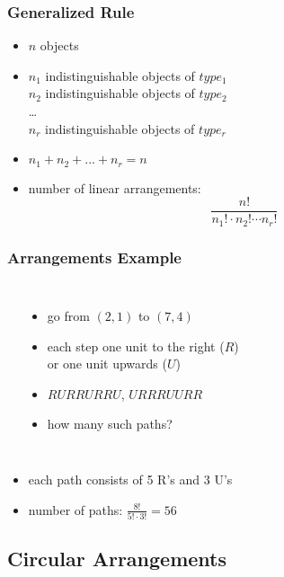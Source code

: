 \documentclass[dvipsnames]{beamer}
\begin{document}
\begin{frame}
  \frametitle{Generalized Rule}

  \begin{itemize}
    \item $n$ objects
    \item $n_1$ indistinguishable objects of $type_1$\\
      $n_2$ indistinguishable objects of $type_2$\\
      \ldots\\
      $n_r$ indistinguishable objects of $type_r$
    \item $n_1 + n_2 + ... + n_r = n$

    \pause
    \medskip
    \item number of linear arrangements:
    \begin{equation*}
      \frac{n!}{n_1! \cdot n_2! \cdots n_r!}
    \end{equation*}
  \end{itemize}
\end{frame}

\begin{frame}
  \frametitle{Arrangements Example}

  \begin{columns}[t]
    \begin{center}
    \end{center}

    \begin{itemize}
      \item go from $(2,1)$ to $(7,4)$
      \item each step one unit to the right ($R$)\\
        or one unit upwards ($U$)
      \item $RURRURRU$, $URRRUURR$
      \item how many such paths?
    \end{itemize}
  \end{columns}

  \pause
  \medskip
  \begin{itemize}
    \item each path consists of 5 R's and 3 U's
    \item number of paths: $\frac{8!}{5! \cdot 3!} = 56$
  \end{itemize}
\end{frame}

\subsection{Circular Arrangements}
\end{document}
